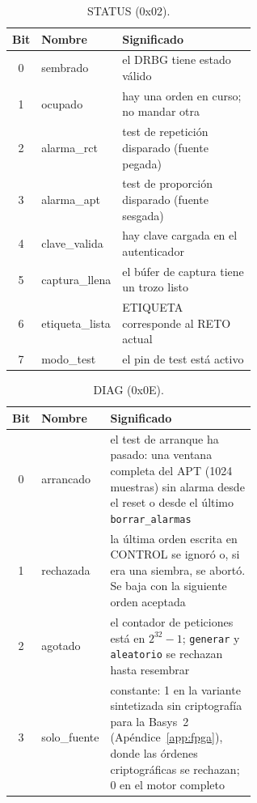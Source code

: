 
\begin{table}[htbp]
\centering\small
\caption{STATUS (0x02).}
\label{tab:app_status}
\begin{tabular}{@{}cl>{\raggedright\arraybackslash}p{0.6\linewidth}@{}}
\toprule
Bit & Nombre & Significado \\
\midrule
0 & sembrado & el \ac{DRBG} tiene estado válido \\
1 & ocupado & hay una orden en curso; no mandar otra \\
2 & alarma\_rct & test de repetición disparado (fuente pegada) \\
3 & alarma\_apt & test de proporción disparado (fuente sesgada) \\
4 & clave\_valida & hay clave cargada en el autenticador \\
5 & captura\_llena & el búfer de captura tiene un trozo listo \\
6 & etiqueta\_lista & ETIQUETA corresponde al RETO actual \\
7 & modo\_test & el pin de test está activo \\
\bottomrule
\end{tabular}
\end{table}

\begin{table}[htbp]
\centering\small
\caption{DIAG (0x0E).}
\label{tab:app_diag}
\begin{tabular}{@{}cl>{\raggedright\arraybackslash}p{0.6\linewidth}@{}}
\toprule
Bit & Nombre & Significado \\
\midrule
0 & arrancado & el test de arranque ha pasado: una ventana completa del
  \ac{APT} (1024 muestras) sin alarma desde el reset o desde el último
  \texttt{borrar\_alarmas} \\
1 & rechazada & la última orden escrita en CONTROL se ignoró o, si era una
  siembra, se abortó. Se baja con la siguiente orden aceptada \\
2 & agotado & el contador de peticiones está en $2^{32}-1$;
  \texttt{generar} y \texttt{aleatorio} se rechazan hasta resembrar \\
3 & solo\_fuente & constante: 1 en la variante sintetizada sin
  criptografía para la Basys~2 (Apéndice~\ref{app:fpga}), donde las
  órdenes criptográficas se rechazan; 0 en el motor completo \\
\bottomrule
\end{tabular}
\end{table}


